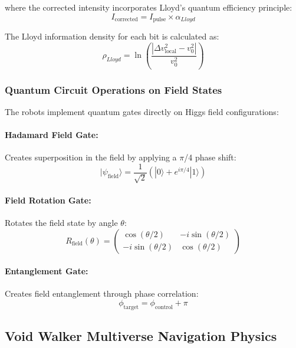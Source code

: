 \documentclass[11pt,a4paper]{article}
\begin{document}
where the corrected intensity incorporates Lloyd's quantum efficiency principle:
\begin{equation}
I_{\text{corrected}} = I_{\text{pulse}} \times \alpha_{Lloyd}
\end{equation}

The Lloyd information density for each bit is calculated as:
\begin{equation}
\rho_{Lloyd} = \ln\left(\frac{|\Delta v^2_{\text{local}} - v_0^2|}{v_0^2}\right)
\end{equation}

\subsubsection{Quantum Circuit Operations on Field States}
The robots implement quantum gates directly on Higgs field configurations:

\paragraph{Hadamard Field Gate:}
Creates superposition in the field by applying a $\pi$/4 phase shift:
\begin{equation}
|\psi_{\text{field}}\rangle = \frac{1}{\sqrt{2}}(|0\rangle + e^{i\pi/4}|1\rangle)
\end{equation}

\paragraph{Field Rotation Gate:}
Rotates the field state by angle $\theta$:
\begin{equation}
R_{\text{field}}(\theta) = \begin{pmatrix} 
\cos(\theta/2) & -i\sin(\theta/2) \\
-i\sin(\theta/2) & \cos(\theta/2)
\end{pmatrix}
\end{equation}

\paragraph{Entanglement Gate:}
Creates field entanglement through phase correlation:
\begin{equation}
\phi_{\text{target}} = \phi_{\text{control}} + \pi
\end{equation}

\subsection{Void Walker Multiverse Navigation Physics}
\end{document}
